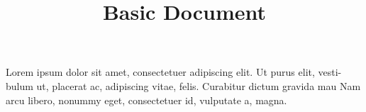 \documentclass{article}
\begin{document}
\title{Basic Document}
\author{}
\date{}

\maketitle

Lorem ipsum dolor sit amet, consectetuer adipiscing elit. Ut purus elit, vesti-
bulum ut, placerat ac, adipiscing vitae, felis. Curabitur dictum gravida mau
\nobreak %
\phantom{\hskip 10pt plus 6pt minus 5pt} %
\break %
\hbox{}
Nam arcu libero, nonummy eget, consectetuer id, vulputate a, magna.
\end{document}
